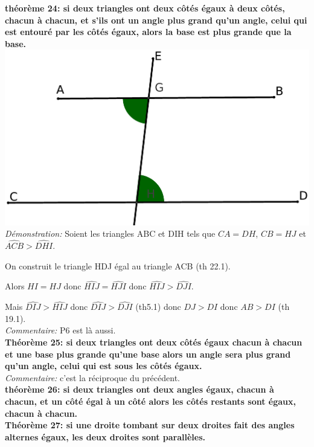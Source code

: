 \documentclass[a4paper, 12pt, twoside]{book}
\begin{document}
\textbf{théorème 24: si deux triangles ont deux côtés égaux à deux côtés, chacun à chacun, et s'ils ont un angle plus grand qu'un angle, celui qui est entouré par les côtés égaux, alors la base est plus grande que la base.} \\

\includegraphics[scale=0.2]{figures/th24.eps} \\

\textit{Démonstration:} Soient les triangles ABC et DIH tels que $CA=DH$, $CB=HJ$ et $\hat{ACB}>\hat{DHI}$.\

On construit  le triangle HDJ égal au triangle ACB (th 22.1).\

Alors $HI=HJ$ donc $\hat{HIJ}=\hat{HJI}$ donc $\hat{HIJ}>\hat{DJI}$.\

Mais $\hat{DIJ}>\hat{HIJ}$ donc $\hat{DIJ}>\hat{DJI}$ (th5.1) donc $DJ>DI$ donc $AB>DI$ (th 19.1).\\

\textit{Commentaire:} P6 est là aussi.\\


\newpage \textbf{Théorème 25: si deux triangles ont deux côtés égaux chacun à chacun et une base plus grande qu'une base alors un angle sera plus grand qu'un angle, celui qui est sous les côtés égaux.}\\

\textit{Commentaire:} c'est la réciproque du précédent.\\

  \textbf{théorème 26: si deux triangles ont deux angles égaux, chacun à chacun, et un côté égal à un côté alors les côtés restants sont égaux, chacun à chacun.}\\
  
   \textbf{Théorème 27: si une droite tombant sur deux droites fait des angles alternes égaux, les deux droites sont parallèles.}\\
  
\end{document}
